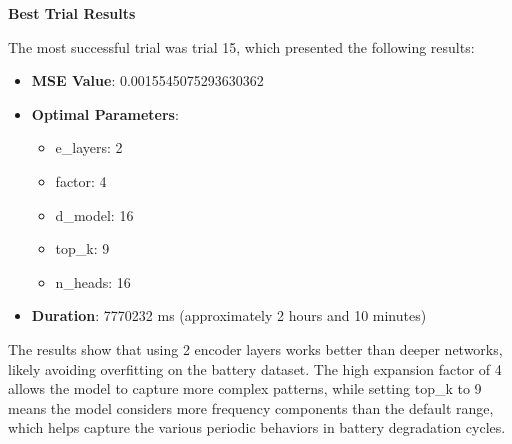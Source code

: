 \textbf{Best Trial Results}

The most successful trial was trial 15, which presented the following results:

\begin{itemize}
    \item \textbf{MSE Value}: 0.0015545075293630362
    \item \textbf{Optimal Parameters}:
    \begin{itemize}
        \item e\_layers: 2
        \item factor: 4  
        \item d\_model: 16
        \item top\_k: 9
        \item n\_heads: 16
    \end{itemize}
    \item \textbf{Duration}: 7770232 ms (approximately 2 hours and 10 minutes)
\end{itemize}

The results show that using 2 encoder layers works better than deeper networks, likely avoiding overfitting on the battery dataset. The high expansion factor of 4 allows the model to capture more complex patterns, while setting top\_k to 9 means the model considers more frequency components than the default range, which helps capture the various periodic behaviors in battery degradation cycles.
